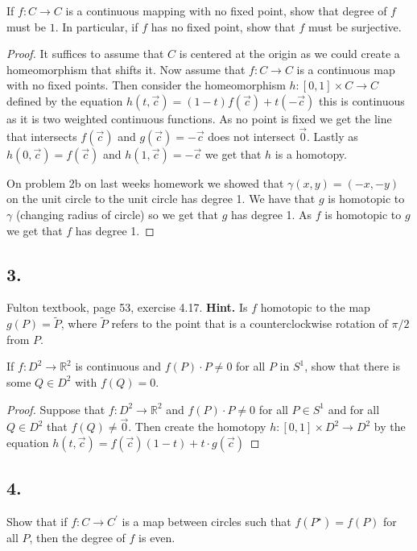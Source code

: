 \documentclass{amsart}
\theoremstyle{plain}
\theoremstyle{definition}
\theoremstyle{remark}
\begin{document}
If $f:C\to C$  is a continuous mapping with no fixed point, show that degree of $f$ must be $1$. In particular, if $f$ has no fixed point, show that $f$ must be surjective. 

\begin{proof}
    It suffices to assume that $C$ is centered at the origin as we could create a homeomorphism that shifts it. Now assume that $f:C\to C$ is a continuous map with no fixed points. Then consider the homeomorphism $h:[0,1]\times C\to C$ defined by the equation $h(t,\vec c)=(1-t)f(\vec c)+t(-\vec c)$ this is continuous as it is two weighted continuous functions. As no point is fixed we get the line that intersects $f(\vec c)$ and $g(\vec c)=-\vec c$ does not intersect $\vec 0$. Lastly as $h(0,\vec c)=f(\vec c)$ and $h(1,\vec c)=-\vec c$ we get that $h$ is a homotopy. 
    
    On problem 2b on last weeks homework we showed that $\gamma(x,y)=(-x,-y)$ on the unit circle to the unit circle has degree 1. We have that $g$ is homotopic to $\gamma$ (changing radius of circle) so we get that $g$ has degree 1. As $f$ is homotopic to $g$ we get that $f$ has degree 1.

\end{proof}


\vspace{.15in}
\noindent
\subsection*{3.} Fulton textbook, page 53, exercise 4.17. {\bf  Hint.} Is $f$ homotopic to the map $g(P) = \widetilde{P}$, where $\widetilde{P}$ refers to the point that is a counterclockwise rotation of $\pi /2$ from $P$. 

If $f:D^2\to \mathbb{R}^2$ is continuous and $f(P)\cdot P\not = 0$ for all $P$ in $S^1$, show that there is some $Q\in D^2$ with $f(Q)=0$.

\begin{proof}
    Suppose that $f:D^2 \to \mathbb R^2 $ and $f(P)\cdot P\not = 0$ for all $P\in S^1$ and for all $Q\in D^2$ that $f(Q)\not = \vec 0$. 
    Then create the homotopy $h:[0,1]\times D^2\to D^2$ by the equation $h(t,\vec c)=f(\vec c)(1-t)+t\cdot g(\vec c)$


\end{proof}


\vspace{.15in}
\noindent
\subsection*{4.} Show that if $f:C\to C^\prime$ is a map between circles such that $f(P^\star)=f(P)$ for all $P$, then the degree of $f$ is even.
\end{document}

